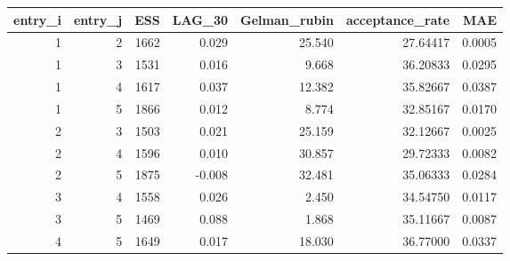 \begin{longtable}{rrrrrrr}
\toprule
entry\_i & entry\_j & ESS & LAG\_30 & Gelman\_rubin & acceptance\_rate & MAE \\ 
\midrule
1 & 2 & 1662 & 0.029 & 25.540 & 27.64417 & 0.0005 \\ 
1 & 3 & 1531 & 0.016 & 9.668 & 36.20833 & 0.0295 \\ 
1 & 4 & 1617 & 0.037 & 12.382 & 35.82667 & 0.0387 \\ 
1 & 5 & 1866 & 0.012 & 8.774 & 32.85167 & 0.0170 \\ 
2 & 3 & 1503 & 0.021 & 25.159 & 32.12667 & 0.0025 \\ 
2 & 4 & 1596 & 0.010 & 30.857 & 29.72333 & 0.0082 \\ 
2 & 5 & 1875 & -0.008 & 32.481 & 35.06333 & 0.0284 \\ 
3 & 4 & 1558 & 0.026 & 2.450 & 34.54750 & 0.0117 \\ 
3 & 5 & 1469 & 0.088 & 1.868 & 35.11667 & 0.0087 \\ 
4 & 5 & 1649 & 0.017 & 18.030 & 36.77000 & 0.0337 \\ 
\bottomrule
\end{longtable}

